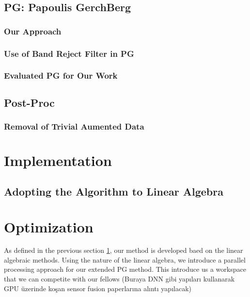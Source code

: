 \documentclass[conference]{IEEEtran}
\begin{document}
\subsection{PG: Papoulis GerchBerg}

\subsubsection{Our Approach}
\subsubsection{Use of Band Reject Filter in PG}
\subsubsection{Evaluated PG for Our Work}
\subsection{Post-Proc}
\subsubsection{Removal of Trivial Aumented Data}

\section{Implementation} \label{implementation}
\subsection{Adopting the Algorithm to Linear Algebra}

\section{Optimization}

As defined in the previous section \ref{implementation}, our method is developed baed on the linear algebraic methods. Using the nature of the linear algebra, we introduce a parallel processing approach for our extended PG method. This introduce us a workspace that we can competite with our fellows (Buraya DNN gibi yapıları kullanarak GPU üzerinde koşan sensor fusion paperlarına alıntı yapılacak)
\end{document}
